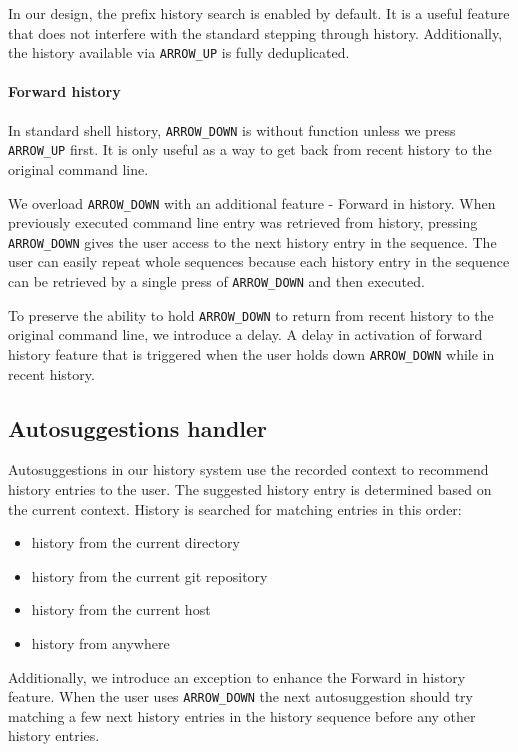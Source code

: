 In our design, the prefix history search is enabled by default. It is a useful feature that does not interfere with the standard stepping through history. Additionally, the history available via \verb|ARROW_UP| is fully deduplicated.

\paragraph{Forward history}

In standard shell history, \verb|ARROW_DOWN| is without function unless we press \verb|ARROW_UP| first. It is only useful as a way to get back from recent history to the original command line.

We overload \verb|ARROW_DOWN| with an additional feature - Forward in history. When previously executed command line entry was retrieved from history, pressing \verb|ARROW_DOWN| gives the user access to the next history entry in the sequence. 
The user can easily repeat whole sequences because each history entry in the sequence can be retrieved by a single press of \verb|ARROW_DOWN| and then executed. 


To preserve the ability to hold \verb|ARROW_DOWN| to return from recent history to the original command line, we introduce a delay. A delay in activation of forward history feature that is triggered when the user holds down \verb|ARROW_DOWN| while in recent history.

\subsection{Autosuggestions handler}

Autosuggestions in our history system use the recorded context to recommend history entries to the user. The suggested history entry is determined based on the current context. History is searched for matching entries in this order:

\begin{itemize}
\item history from the current directory
\item history from the current git repository
\item history from the current host
\item history from anywhere
\end{itemize}

Additionally, we introduce an exception to enhance the Forward in history feature. 
When the user uses \verb|ARROW_DOWN| the next autosuggestion should try matching a few next history entries in the history sequence before any other history entries. 

